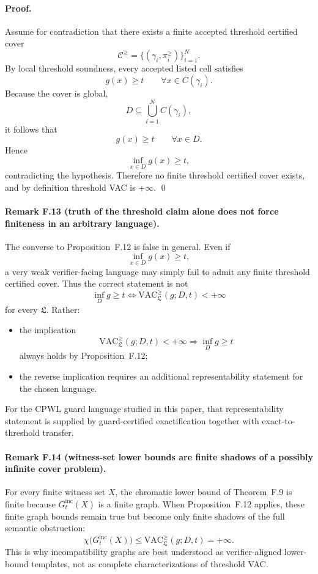 \paragraph{Proof.}
Assume for contradiction that there exists a finite accepted threshold certified cover
\[
\mathcal C^{\ge}=
\{(\gamma_i,\pi_i^{\ge})\}_{i=1}^N.
\]
By local threshold soundness, every accepted listed cell satisfies
\[
g(x)\ge t
\qquad \forall x\in C(\gamma_i).
\]
Because the cover is global,
\[
D\subseteq \bigcup_{i=1}^N C(\gamma_i),
\]
it follows that
\[
g(x)\ge t
\qquad \forall x\in D.
\]
Hence
\[
\inf_{x\in D}g(x)\ge t,
\]
contradicting the hypothesis. Therefore no finite threshold certified cover exists, and by definition threshold VAC is $+\infty$. \qed

\paragraph{Remark F.13 (truth of the threshold claim alone does not force finiteness in an arbitrary language).}
The converse to Proposition~F.12 is false in general. Even if
\[
\inf_{x\in D}g(x)\ge t,
\]
a very weak verifier-facing language may simply fail to admit any finite threshold certified cover. Thus the correct statement is not
\[
\inf_D g\ge t \iff \mathrm{VAC}^{\ge}_{\mathfrak L}(g;D,t)<+\infty
\]
for every $\mathfrak L$. Rather:
\begin{itemize}
    \item the implication
    \[
    \mathrm{VAC}^{\ge}_{\mathfrak L}(g;D,t)<+\infty
    \Longrightarrow
    \inf_D g\ge t
    \]
    always holds by Proposition~F.12;
    \item the reverse implication requires an additional representability statement for the chosen language.
\end{itemize}
For the CPWL guard language studied in this paper, that representability statement is supplied by guard-certified exactification together with exact-to-threshold transfer.

\paragraph{Remark F.14 (witness-set lower bounds are finite shadows of a possibly infinite cover problem).}
For every finite witness set $X$, the chromatic lower bound of Theorem~F.9 is finite because $G_t^{\mathrm{inc}}(X)$ is a finite graph. When Proposition~F.12 applies, these finite graph bounds remain true but become only finite shadows of the full semantic obstruction:
\[
\chi\bigl(G_t^{\mathrm{inc}}(X)\bigr)
\le
\mathrm{VAC}^{\ge}_{\mathfrak L}(g;D,t)
=
+\infty.
\]
This is why incompatibility graphs are best understood as verifier-aligned lower-bound templates, not as complete characterizations of threshold VAC.

